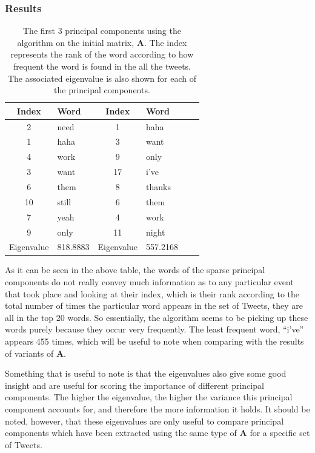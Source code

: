 \documentclass[11pt,a4paper]{article}
\newcommand{\covmat}{\mathbf{A}}
\begin{document}
\subsubsection*{Results}
\begin{table}[H]
\center
\begin{tabular}{| c l | c l | c l |}
\hline
Index & Word & Index & Word\\
\hline
2 & need & 1 & haha \\
1 & haha & 3 & want \\
4 & work & 9 &only\\
3 & want & 17 & i've\\
6 & them & 8 & thanks\\
10 & still& 6 & them\\ 
7 & yeah & 4 & work\\
9 & only & 11 & night\\
\hline
Eigenvalue & 818.8883  & Eigenvalue & 557.2168\\
\hline
\end{tabular}
\caption{The first 3 principal components using the algorithm on the initial matrix, $ \mathbf{A}$. The index represents the rank of the word according to how frequent the word is found in the all the tweets. The associated eigenvalue is also shown for each of the principal components.}
\end{table}

As it can be seen in the above table, the words of the sparse principal components do not really convey much information as to any particular event that took place and looking at their index, which is their rank according to the total number of times the particular word appears in the set of Tweets, they are all in the top 20 words. So essentially, the algorithm seems to be picking up these words purely because they occur very frequently. The least frequent word, ``i've'' appears 455 times, which will be useful to note when comparing with the results of variants of $\covmat$.

Something that is useful to note is that the eigenvalues also give some good insight and are useful for scoring the importance of different principal components. The higher the eigenvalue, the higher the variance this principal component accounts for, and therefore the more information it holds. It should be noted, however, that these eigenvalues are only useful to compare principal components which have been extracted using the same type of $\covmat$ for a specific set of Tweets.
\end{document}
